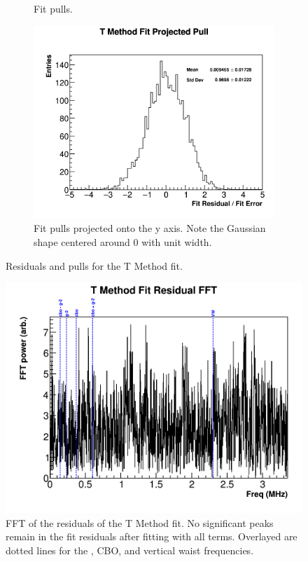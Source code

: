 \begin{figure}[h]
\begin{subfigure}[]{0.45\textwidth}
		    \caption{Fit pulls.}
	    \end{subfigure}%
	    \vspace{4mm}
	    \begin{subfigure}[]{0.7\textwidth}
		    \centering
			\includegraphics[width=\textwidth]{fitPull_projected_TMethod}
		    \caption{Fit pulls projected onto the y axis. Note the Gaussian shape centered around 0 with unit width.}
	    \end{subfigure}
	\caption[fitResidual_TMethod]{Residuals and pulls for the T Method fit.}
	\label{fig:fitResidual_TMethod}
	\end{figure}

	\begin{figure}[]
		\centering
		\includegraphics[width=\textwidth]{FFT_TMethodFit}
	    \caption[FFT_TMethodFit]{FFT of the residuals of the T Method fit. No significant peaks remain in the fit residuals after fitting with all terms. Overlayed are dotted lines for the \gmtwo, CBO, and vertical waist frequencies.}
	    \label{fig:FFT_TMethodFit}
	\end{figure}

